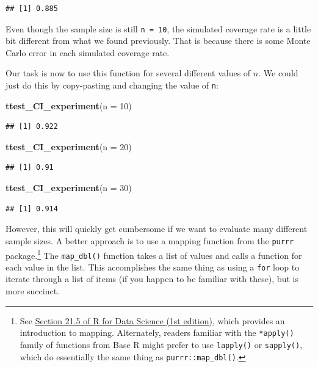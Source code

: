 \documentclass[
]{book}
\newenvironment{Shaded}{\begin{snugshade}}{\end{snugshade}}
\newcommand{\AttributeTok}[1]{\textcolor[rgb]{0.13,0.29,0.53}{#1}}
\newcommand{\DecValTok}[1]{\textcolor[rgb]{0.00,0.00,0.81}{#1}}
\newcommand{\FunctionTok}[1]{\textcolor[rgb]{0.13,0.29,0.53}{\textbf{#1}}}
\newcommand{\NormalTok}[1]{#1}
\begin{document}
\begin{verbatim}
## [1] 0.885
\end{verbatim}

Even though the sample size is still \texttt{n\ =\ 10}, the simulated coverage rate is a little bit different from what we found previously.
That is because there is some Monte Carlo error in each simulated coverage rate.

Our task is now to use this function for several different values of \(n\). We could just do this by copy-pasting and changing the value of \texttt{n}:

\begin{Shaded}
\begin{Highlighting}[]
\FunctionTok{ttest\_CI\_experiment}\NormalTok{(}\AttributeTok{n =} \DecValTok{10}\NormalTok{)}
\end{Highlighting}
\end{Shaded}

\begin{verbatim}
## [1] 0.922
\end{verbatim}

\begin{Shaded}
\begin{Highlighting}[]
\FunctionTok{ttest\_CI\_experiment}\NormalTok{(}\AttributeTok{n =} \DecValTok{20}\NormalTok{)}
\end{Highlighting}
\end{Shaded}

\begin{verbatim}
## [1] 0.91
\end{verbatim}

\begin{Shaded}
\begin{Highlighting}[]
\FunctionTok{ttest\_CI\_experiment}\NormalTok{(}\AttributeTok{n =} \DecValTok{30}\NormalTok{)}
\end{Highlighting}
\end{Shaded}

\begin{verbatim}
## [1] 0.914
\end{verbatim}

However, this will quickly get cumbersome if we want to evaluate many different sample sizes.
A better approach is to use a mapping function from the \texttt{purrr} package.\footnote{See \href{https://r4ds.had.co.nz/iteration.html\#the-map-functions}{Section 21.5 of R for Data Science (1st edition)}, which provides an introduction to mapping. Alternately, readers familiar with the \texttt{*apply()} family of functions from Base R might prefer to use \texttt{lapply()} or \texttt{sapply()}, which do essentially the same thing as \texttt{purrr::map\_dbl()}.}
The \texttt{map\_dbl()} function takes a list of values and calls a function for each value in the list.
This accomplishes the same thing as using a \texttt{for} loop to iterate through a list of items (if you happen to be familiar with these), but is more succinct.
\end{document}
